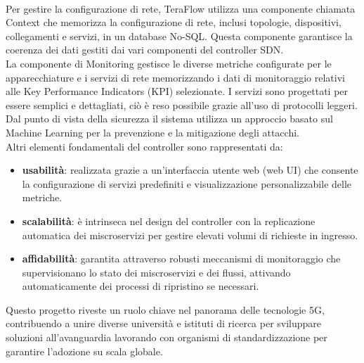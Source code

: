 \\Per gestire la configurazione di rete, TeraFlow utilizza una componente chiamata Context che memorizza la configurazione di rete, inclusi topologie, dispositivi, 
collegamenti e servizi, in un database No-SQL\cite{D31}. Questa componente garantisce la coerenza dei dati gestiti dai vari componenti del controller SDN.
\\La componente di Monitoring gestisce le diverse metriche configurate per le apparecchiature e i servizi di rete memorizzando i dati di monitoraggio relativi alle Key Performance Indicators (KPI) selezionate.
I servizi sono progettati per essere semplici e dettagliati, ciò è reso possibile grazie all'uso di protocolli leggeri.
Dal punto di vista della sicurezza il sistema utilizza un approccio basato sul Machine Learning per la prevenzione e la mitigazione degli attacchi.
\\Altri elementi fondamentali del controller sono rappresentati da\cite{D22}:
\begin{itemize} 
    \item \textbf{usabilità}: realizzata grazie a un'interfaccia utente web (web UI) che consente la configurazione di servizi predefiniti e visualizzazione personalizzabile delle metriche.
    \item \textbf{scalabilità}: è intrinseca nel design del controller con la replicazione automatica dei miscroservizi per gestire elevati volumi di richieste in ingresso.
    \item \textbf{affidabilità}: garantita attraverso robusti meccanismi di monitoraggio che supervisionano lo stato dei miscroservizi e dei flussi, attivando automaticamente dei processi di ripristino se necessari.
\end{itemize}
Questo progetto riveste un ruolo chiave nel panorama delle tecnologie 5G, contribuendo a unire diverse università e istituti di ricerca per sviluppare soluzioni all'avanguardia
lavorando con organismi di standardizzazione per garantire l'adozione su scala globale.
